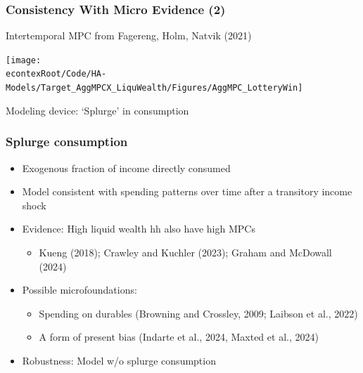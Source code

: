 \documentclass[pdflatex,aspectratio=169, handout]{beamer}
\begin{document}
\begin{frame}
	\frametitle{Consistency With Micro Evidence (2)}
			Intertemporal MPC from Fagereng, Holm, Natvik (2021)
			\begin{center}
			\texttt{[image: \\econtexRoot/Code/HA-Models/Target\_AggMPCX\_LiquWealth/Figures/AggMPC\_LotteryWin]}
			\end{center}			
			Modeling device: `Splurge' in consumption
\end{frame}


\begin{frame}
\frametitle{Splurge consumption}
\begin{itemize}
	\itemsep = .75\bigskipamount 
	\item Exogenous fraction of income directly consumed
	\item Model consistent with spending patterns over time after a transitory income shock
	\item Evidence: High liquid wealth hh also have high MPCs
	\begin{itemize}
		\itemsep = .25\bigskipamount 
		\item Kueng (2018); Crawley and Kuchler (2023); Graham and McDowall (2024) 
	\end{itemize}
	\item Possible microfoundations: 
	\begin{itemize}
	\itemsep = .25\bigskipamount 
	\item Spending on durables (Browning and Crossley, 2009; Laibson et al., 2022)
	\item A form of present bias (Indarte et al., 2024, Maxted et al., 2024)
	\end{itemize}
	\item Robustness: Model w/o splurge consumption 
\end{itemize}
\end{frame}
\end{document}

